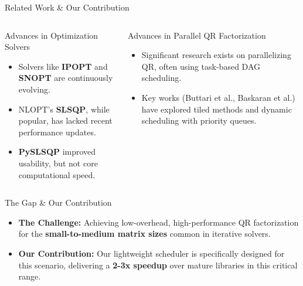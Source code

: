 \begin{frame}{Related Work \& Our Contribution}

	\begin{columns}[T,onlytextwidth]	
		\pause 
		\begin{block}{Advances in Optimization Solvers}
		  \begin{itemize}
		    \item Solvers like \textbf{IPOPT} and \textbf{SNOPT} are continuously evolving.
		    \item NLOPT's \textbf{SLSQP}, while popular, has lacked recent performance updates.
		    \item \textbf{PySLSQP} improved usability, but not core computational speed.
		  \end{itemize}
		\end{block}
		
		\begin{block}{Advances in Parallel QR Factorization}
		  \begin{itemize}
		    \item Significant research exists on parallelizing QR, often using task-based DAG scheduling.
		    \item Key works (Buttari et al., Baskaran et al.) have explored tiled methods and dynamic scheduling with priority queues.
		  \end{itemize}
		\end{block}	
	\end{columns}

	\pause 
\begin{alertblock}{The Gap \& Our Contribution}
    \begin{itemize}
      \item \textbf{The Challenge:} Achieving low-overhead, high-performance QR factorization for the \textbf{small-to-medium matrix sizes} common in iterative solvers.
      \item \textbf{Our Contribution:} Our lightweight scheduler is specifically designed for this scenario, delivering a \textbf{2-3x speedup} over mature libraries in this critical range.
    \end{itemize}
  \end{alertblock}

\end{frame}